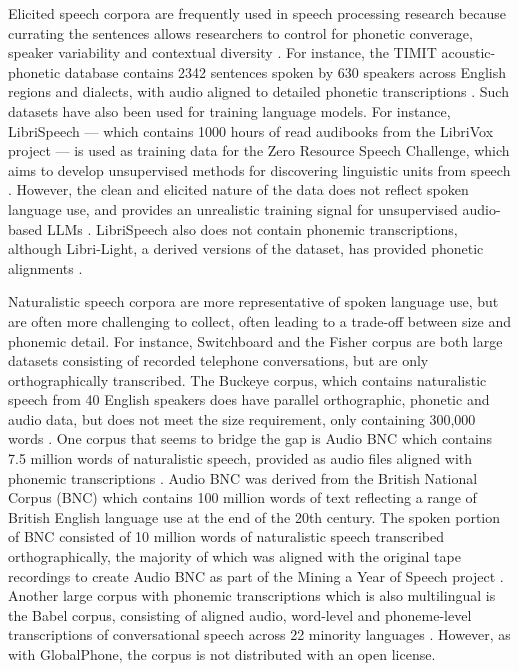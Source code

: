 Elicited speech corpora are frequently used in speech processing research because currating the sentences allows researchers to control for phonetic converage, speaker variability and contextual diversity \citep{lamel1989speech}. For instance, the TIMIT acoustic-phonetic database contains 2342 sentences spoken by 630 speakers across English regions and dialects, with audio aligned to detailed phonetic transcriptions \citep{garofolo1993darpa}. Such datasets have also been used for training language models. For instance, LibriSpeech --- which contains 1000 hours of read audibooks from the LibriVox project \citep{panayotov2015librispeech} --- is used as training data for the Zero Resource Speech Challenge, which aims to develop unsupervised methods for discovering linguistic units from speech \citep{dunbar_self-supervised_2022}. However, the clean and elicited nature of the data does not reflect spoken language use, and provides an unrealistic training signal for unsupervised audio-based LLMs \citep{lavechin}. LibriSpeech also does not contain phonemic transcriptions, although Libri-Light, a derived versions of the dataset, has provided phonetic alignments \citep{Kahn_2020}.

Naturalistic speech corpora are more representative of spoken language use, but are often more challenging to collect, often leading to a trade-off between size and phonemic detail. For instance, Switchboard \citep{godfrey1992switchboard} and the Fisher corpus \citep{cieri2004fisher} are both large datasets consisting of recorded telephone conversations, but are only orthographically transcribed. The Buckeye corpus, which contains naturalistic speech from 40 English speakers does have parallel orthographic, phonetic and audio data, but does not meet the size requirement, only containing 300,000 words \citep{pitt2007buckeye}. One corpus that seems to bridge the gap is Audio BNC which contains 7.5 million words of naturalistic speech, provided as audio files aligned with phonemic transcriptions \citep{coleman2012audio}. Audio BNC was derived from the British National Corpus (BNC) which contains 100 million words of text \citep{bnc2007} reflecting a range of British English language use at the end of the 20th century. The spoken portion of BNC consisted of 10 million words of naturalistic speech transcribed orthographically, the majority of which was aligned with the original tape recordings to create Audio BNC as part of the Mining a Year of Speech project \citep{coleman2011mining}. Another large corpus with phonemic transcriptions which is also multilingual is the Babel corpus, consisting of aligned audio, word-level and phoneme-level transcriptions of conversational speech across 22 minority languages \citep{gales2014speech}. However, as with GlobalPhone, the corpus is not distributed with an open license. 

